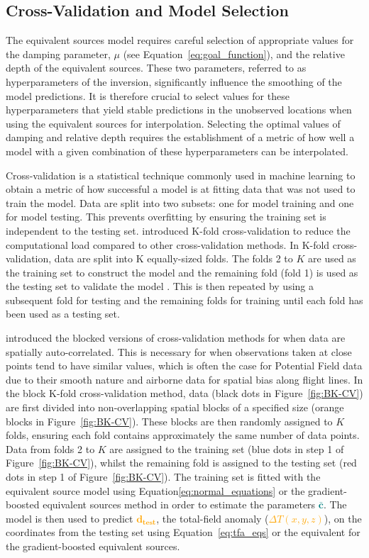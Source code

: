 \subsection{Cross-Validation and Model Selection}

The equivalent sources model requires careful selection of appropriate values for the damping parameter, $\mu$ (see Equation~\ref{eq:goal_function}), and the relative depth of the equivalent sources. These two parameters, referred to as hyperparameters of the inversion, significantly influence the smoothing of the model predictions. It is therefore crucial to select values for these hyperparameters that yield stable predictions in the unobserved locations when using the equivalent sources for interpolation. Selecting the optimal values of damping and relative depth requires the establishment of a metric of how well a model with a given combination of these hyperparameters can be interpolated.

Cross-validation is a statistical technique commonly used in machine learning to obtain a metric of how successful a model is at fitting data that was not used to train the model. Data are split into two subsets: one for model training and one for model testing. This prevents overfitting by ensuring the training set is independent to the testing set. \citet{Geisser1975} introduced K-fold cross-validation to reduce the computational load compared to other cross-validation methods. In K-fold cross-validation, data are split into K equally-sized folds. The folds 2 to $K$ are used as the training set to construct the model and the remaining fold (fold 1) is used as the testing set to validate the model \citep{Jung2017}. This is then repeated by using a subsequent fold for testing and the remaining folds for training until each fold has been used as a testing set.

\citet{Roberts2017} introduced the blocked versions of cross-validation methods for when data are spatially auto-correlated. This is necessary for when observations taken at close points tend to have similar values, which is often the case for Potential Field data due to their smooth nature and airborne data for spatial bias along flight lines. In the block K-fold cross-validation method, data (black dots in Figure~\ref{fig:BK-CV}) are first divided into non-overlapping spatial blocks of a specified size (orange blocks in Figure~\ref{fig:BK-CV}). These blocks are then randomly assigned to $K$ folds, ensuring each fold contains approximately the same number of data points. Data from folds 2 to $K$ are assigned to the training set (blue dots in step 1 of Figure~\ref{fig:BK-CV}), whilst the remaining fold is assigned to the testing set (red dots in step 1 of Figure~\ref{fig:BK-CV}). The training set is fitted with the equivalent source model using Equation\ref{eq:normal_equations} or the gradient-boosted equivalent sources method in order to estimate the parameters \textcolor{teal}{$\bar{\mathbf{c}}$}. The model is then used to predict \textcolor{orange}{$\mathbf{d_{test}}$}, the total-field anomaly (\textcolor{orange}{$\Delta T (x, y, z)$}), on the coordinates from the testing set using Equation~\ref{eq:tfa_eqs} or the equivalent for the gradient-boosted equivalent sources.

